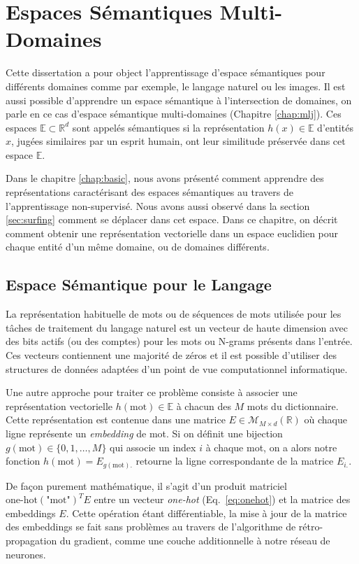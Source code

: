 \chapter{Espaces Sémantiques Multi-Domaines}

Cette dissertation a pour object l'apprentissage d'espace sémantiques pour
différents domaines comme par exemple, le langage naturel ou les images. Il est
aussi possible d'apprendre un espace sémantique à l'intersection de domaines,
on parle en ce cas d'espace sémantique multi-domaines (Chapitre \ref{chap:mlj}). Ces
espaces $\mathbb{E}\subset \mathbb{R}^{d}$ sont appelés sémantiques si la représentation
$h(x)\in \mathbb{E}$ d'entités $x$, jugées similaires par un esprit humain, ont leur
similitude préservée dans cet espace $\mathbb{E}$.

Dans le chapitre \ref{chap:basic}, nous avons présenté comment apprendre des
représentations caractérisant des espaces sémantiques au travers de
l'apprentissage non-supervisé. Nous avons aussi observé dans la section
\ref{sec:surfing} comment se déplacer dans cet espace. Dans ce chapitre, on
décrit comment obtenir une représentation vectorielle dans un espace euclidien
pour chaque entité d'un même domaine, ou de domaines différents.
 
  
\section{Espace Sémantique pour le Langage}

La représentation habituelle de mots ou de séquences de mots utilisée pour les
tâches de traitement du langage naturel est un vecteur de haute dimension avec
des bits actifs (ou des comptes) pour les mots ou N-grams présents dans
l'entrée. Ces vecteurs contiennent une majorité de zéros et il est possible
d'utiliser des structures de données adaptées d'un point de
vue computationnel informatique.

Une autre approche pour traiter ce problème consiste à associer une
représentation vectorielle $h(\textrm{mot})\in\mathbb{E}$ à chacun des $M$ mots
du dictionnaire. Cette représentation est contenue dans une matrice
$E\in\mathcal{M}_{M \times d}(\mathbb{R})$ où chaque ligne représente un {\it
embedding} de mot. Si on définit une bijection $g(\textrm{mot}) \in \lbrace
0,1,\dots, M \rbrace$ qui associe un index $i$ à chaque mot, on a alors notre
fonction $h(\textrm{mot})=E_{g(\textrm{mot}).}$ retourne la ligne
correspondante de la matrice $E_{i.}$.

De façon purement mathématique, il s'agit d'un produit matriciel
$\textrm{one-hot}(\textrm{"mot"})^{T}E$ entre un vecteur {\it one-hot}
(Eq.~\ref{eq:onehot}) et la matrice des embeddings $E$. Cette opération étant
différentiable, la mise à jour de la matrice des embeddings se fait sans
problèmes au travers de l'algorithme de rétro-propagation du gradient, comme
une couche additionnelle à notre réseau de neurones.

